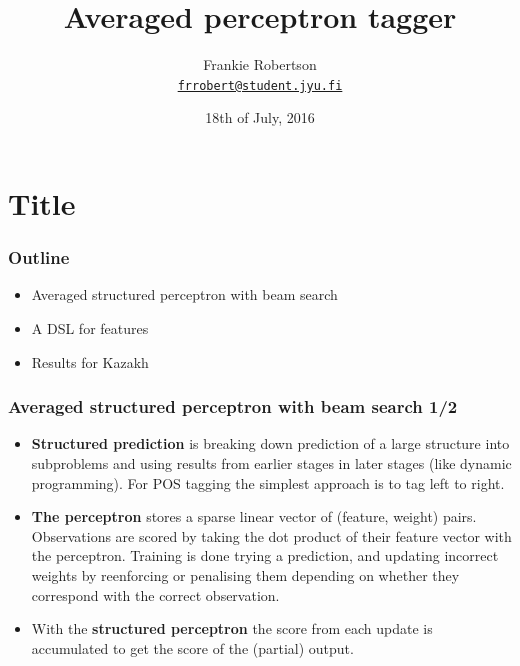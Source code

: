 \documentclass{beamer}
\title[POS tagger internals]{Averaged perceptron tagger}
\institute[JYU]{University of Jyväskylä\\
\vspace{5mm}
\url{https://www.github.com/frankier/perceptron-tagger-slides/}}
\author[Frankie Robertson]{Frankie Robertson\texorpdfstring{\\
\href{mailto:frrobert@student.jyu.fi}{\texttt{frrobert@student.jyu.fi}}}{}}
\date{18th of July, 2016}
\begin{document}
\section{Title}
\begin{frame}
  \titlepage{}
\end{frame}

\begin{frame}
\frametitle{Outline}
\begin{itemize}

  \item Averaged structured perceptron with beam search

  \item A DSL for features

  \item Results for Kazakh

\end{itemize}
\end{frame}

\begin{frame}
\frametitle{Averaged structured perceptron with beam search 1/2}
\begin{itemize}

  \item \textbf{Structured prediction} is breaking down prediction of a large
    structure into subproblems and using results from earlier stages in later
    stages (like dynamic programming). For POS tagging the simplest approach is
    to tag left to right.

  \item \textbf{The perceptron} stores a sparse linear vector of (feature,
    weight) pairs.  Observations are scored by taking the dot product of their
    feature vector with the perceptron. Training is done trying a prediction,
    and updating incorrect weights by reenforcing or penalising them depending
    on whether they correspond with the correct observation.

  \item With the \textbf{structured perceptron} the score from each update is
    accumulated to get the score of the (partial) output.

\end{itemize}
\end{frame}
\end{document}

